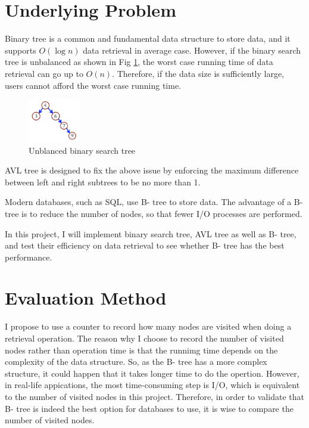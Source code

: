 \documentclass{article}
\begin{document}
\begin{spacing}{1.2}
\section{Underlying Problem}
Binary tree is a common and fundamental data structure to store data, and it supports $O(\log n)$ data retrieval in average case. However, if the binary search tree is unbalanced as shown in Fig \ref{unbalanced}, the worst case running time of data retrieval can go up to $O(n)$. Therefore, if the data size is sufficiently large, users cannot afford the worst case running time.
\begin{figure}[!h]
    \centering
    \includegraphics[width=0.2\textwidth]{unbalanced.png}
    \caption{Unblanced binary search tree}
    \label{unbalanced}
\end{figure}

AVL tree is designed to fix the above issue by enforcing the maximum difference between left and right subtrees to be no more than 1. 

Modern databases, such as SQL, use B- tree to store data. The advantage of a B- tree is to reduce the number of nodes, so that fewer I/O processes are performed. 

In this project, I will implement binary search tree, AVL tree as well as B- tree, and test their efficiency on data retrieval to see whether B- tree has the best performance.

\section{Evaluation Method}
I propose to use a counter to record how many nodes are visited when doing a retrieval operation. The reason why I choose to record the number of visited nodes rather than operation time is that the runnimg time depends on the complexity of the data structure. So, as the B- tree has a more complex structure, it could happen that it takes longer time to do the opertion. However, in real-life appications, the most time-consuming step is I/O, which is equivalent to the number of visited nodes in this project. Therefore, in order to validate that B- tree is indeed the best option for databases to use, it is wise to compare the number of visited nodes.


\end{spacing}
\end{document}
